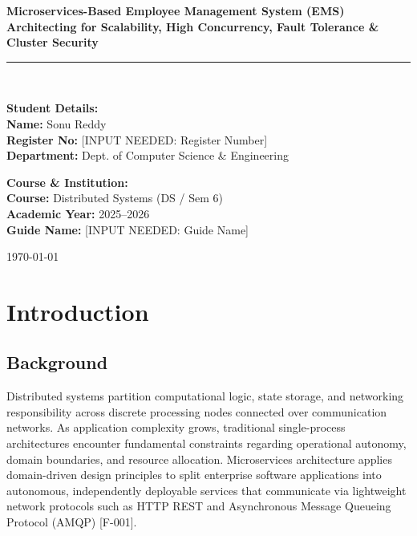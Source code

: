 \documentclass[11pt,a4paper]{article}
\begin{document}
\begin{titlepage}
    \centering
    \vspace*{1cm}
    
    {\Huge \bfseries \color{primary} Microservices-Based Employee Management System (EMS)} \\[0.5cm]
    {\Large \bfseries \color{accent} Architecting for Scalability, High Concurrency, Fault Tolerance \& Cluster Security} \\[1.5cm]
    
    \rule{\linewidth}{1.5pt} \\[1.5cm]
    
    \begin{minipage}{0.48\textwidth}
        \begin{flushleft} \large
            \textbf{\color{primary} Student Details:}\\
            \textbf{Name:} Sonu Reddy \\
            \textbf{Register No:} [INPUT NEEDED: Register Number] \\
            \textbf{Department:} Dept. of Computer Science \& Engineering
        \end{flushleft}
    \end{minipage}
    \begin{minipage}{0.48\textwidth}
        \begin{flushright} \large
            \textbf{\color{primary} Course \& Institution:}\\
            \textbf{Course:} Distributed Systems (DS / Sem 6) \\
            \textbf{Academic Year:} 2025–2026 \\
            \textbf{Guide Name:} [INPUT NEEDED: Guide Name]
        \end{flushright}
    \end{minipage}
    
    \vfill
    
    {\large \today}
\end{titlepage}

\newpage
\tableofcontents
\newpage

\section{Introduction}

\subsection{Background}
Distributed systems partition computational logic, state storage, and networking responsibility across discrete processing nodes connected over communication networks. As application complexity grows, traditional single-process architectures encounter fundamental constraints regarding operational autonomy, domain boundaries, and resource allocation. Microservices architecture applies domain-driven design principles to split enterprise software applications into autonomous, independently deployable services that communicate via lightweight network protocols such as HTTP REST and Asynchronous Message Queueing Protocol (AMQP) [F-001].
\end{document}
